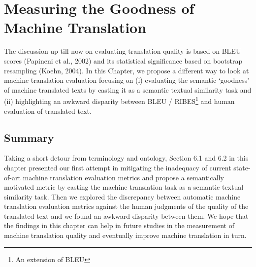 






\chapter{Measuring the Goodness of Machine Translation}
\label{chap:goodness}

The discussion up till now on evaluating  translation quality is based on BLEU scores (Papineni et al., 2002) and its statistical significance based on bootstrap resampling  (Koehn, 2004). In this Chapter, we propose a different way to look at machine translation evaluation focusing on (i) evaluating the semantic `goodness' of machine translated texts by casting it as a semantic textual similarity task and (ii) highlighting an awkward disparity between BLEU / RIBES\footnote{An extension of BLEU} and human evaluation of translated text. 



\newpage


\newpage
\section{Summary}

Taking a short detour from terminology and ontology, Section 6.1 and 6.2 in this chapter presented our first attempt in mitigating the inadequacy of current state-of-art machine translation evaluation metrics and propose a semantically motivated metric by casting the machine translation task as a semantic textual similarity task. Then we explored the discrepancy between automatic machine translation evaluation metrics against the human judgments of the quality of the translated text and we found an awkward disparity between them. We hope that the findings in this chapter can help in future studies in the measurement of machine translation quality and eventually improve machine translation in turn. 

